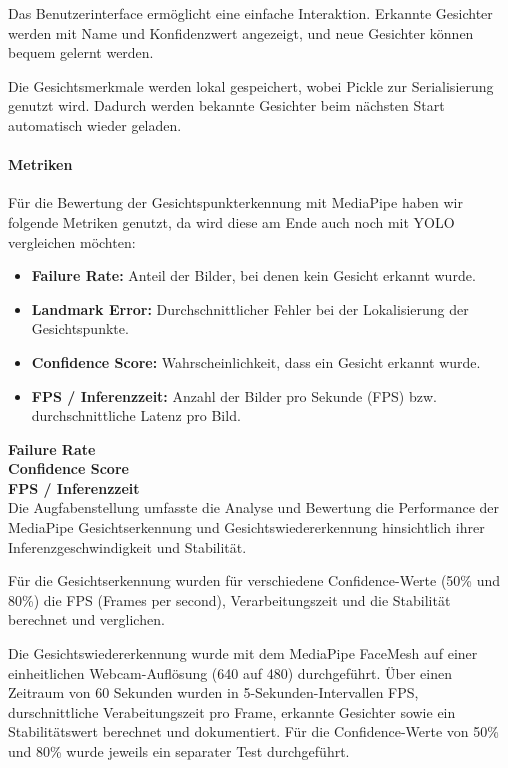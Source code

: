 Das Benutzerinterface ermöglicht eine einfache Interaktion.
Erkannte Gesichter werden mit Name und Konfidenzwert angezeigt, und neue Gesichter können bequem gelernt werden.

Die Gesichtsmerkmale werden lokal gespeichert, wobei Pickle zur Serialisierung genutzt wird. Dadurch werden bekannte Gesichter beim nächsten Start automatisch wieder geladen.


\paragraph{Metriken}
Für die Bewertung der Gesichtspunkterkennung mit MediaPipe haben wir folgende Metriken genutzt, da wird diese am Ende auch noch mit YOLO vergleichen möchten:
\begin{itemize}
    \item \textbf{Failure Rate:} Anteil der Bilder, bei denen kein Gesicht erkannt wurde.
    \item \textbf{Landmark Error:} Durchschnittlicher Fehler bei der Lokalisierung der Gesichtspunkte.
    \item \textbf{Confidence Score:} Wahrscheinlichkeit, dass ein Gesicht erkannt wurde.
    \item \textbf{FPS / Inferenzzeit:} Anzahl der Bilder pro Sekunde (FPS) bzw. durchschnittliche Latenz pro Bild.
\end{itemize}


\textbf{Failure Rate} \\


\textbf{Confidence Score} \\


\textbf{FPS / Inferenzzeit} \\

Die Augfabenstellung umfasste die Analyse und Bewertung die Performance der MediaPipe Gesichtserkennung und Gesichtswiedererkennung hinsichtlich ihrer Inferenzgeschwindigkeit und Stabilität.

Für die Gesichtserkennung wurden für verschiedene Confidence-Werte (50\% und 80\%) die FPS (Frames per second), Verarbeitungszeit und die Stabilität berechnet und verglichen.

Die Gesichtswiedererkennung wurde mit dem MediaPipe FaceMesh auf einer einheitlichen Webcam-Auflösung (640 auf 480) durchgeführt. Über einen Zeitraum von 60 Sekunden wurden in 5-Sekunden-Intervallen FPS, durschnittliche Verabeitungszeit pro Frame, erkannte Gesichter sowie ein Stabilitätswert berechnet und dokumentiert.
Für die Confidence-Werte von 50\% und 80\% wurde jeweils ein separater Test durchgeführt.

